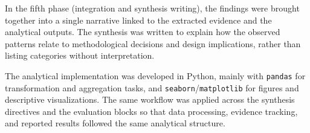 In the fifth phase (integration and synthesis writing), the findings were brought together into a single narrative linked to the extracted evidence and the analytical outputs. The synthesis was written to explain how the observed patterns relate to methodological decisions and design implications, rather than listing categories without interpretation.

The analytical implementation was developed in Python, mainly with \texttt{pandas} for transformation and aggregation tasks, and \texttt{seaborn}/\texttt{matplotlib} for figures and descriptive visualizations. The same workflow was applied across the synthesis directives and the evaluation blocks so that data processing, evidence tracking, and reported results followed the same analytical structure.
